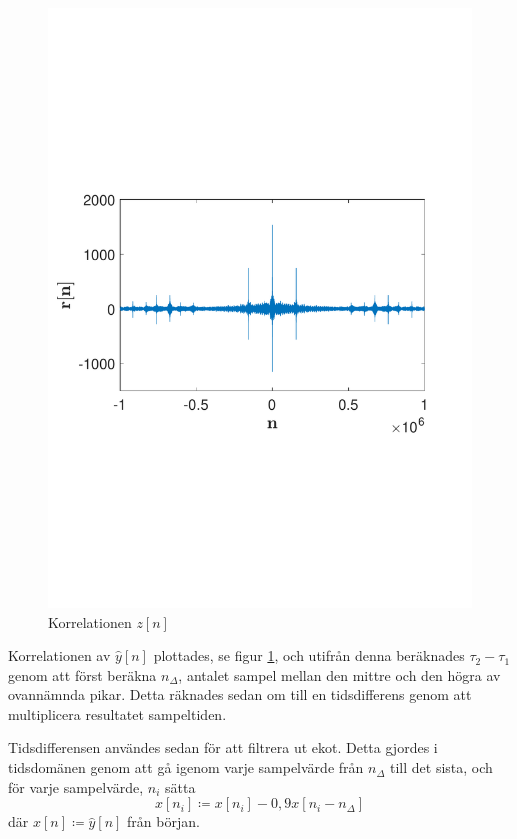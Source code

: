 \documentclass[10pt,twocolumn]{article}
\begin{document}
\begin{figure}
    \includegraphics[width=\linewidth]{fig1}
    \caption{
        Korrelationen $z[n]$ 
        \label{fig:z}
    }
\end{figure}

Korrelationen av $\hat{y}[n]$ plottades, se figur \ref{fig:z}, och utifrån denna beräknades $\tau_2 - \tau_1$ genom att först beräkna $n_\Delta$, antalet sampel mellan
den mittre och den högra av ovannämnda pikar. Detta räknades sedan om till en tidsdifferens genom att multiplicera resultatet
sampeltiden.

Tidsdifferensen användes sedan för att filtrera ut ekot. Detta gjordes i tidsdomänen genom att gå igenom varje sampelvärde
från $n_\Delta$ till det sista, och för varje sampelvärde, $n_i$ sätta 
\begin{equation}
x[n_i] \coloneqq x[n_i] - 0,9x[n_i - n_\Delta] 
\label{e4}
\end{equation}
där $x[n] \coloneqq \hat{y}[n]$ från början.
\end{document}
